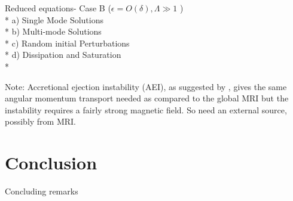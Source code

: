 \documentclass{jfm}
\begin{document}
 Reduced equations- Case B ($  \epsilon =O( \delta), \Lambda \gg 1 $ ) \\*
 a) Single Mode Solutions \\*
 b) Multi-mode Solutions \\*
 c) Random initial Perturbations \\*
 d) Dissipation and Saturation \\*
 
Note: Accretional ejection instability (AEI), as suggested by \cite{Caunt2011},
gives the same angular momentum transport needed as compared to the global MRI
but the instability requires a fairly strong magnetic field. So need an 
external source, possibly from MRI.



\section{Conclusion}
Concluding remarks





\end{document}
